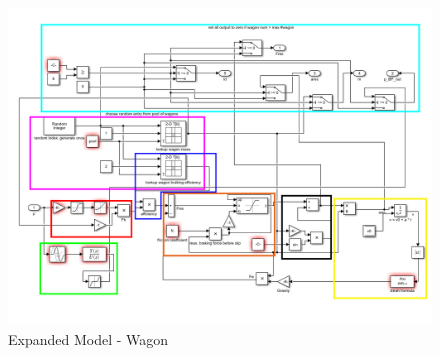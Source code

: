 \begin{figure}[H]
	\centering
	\includegraphics[width=\linewidth]{./pic/expandedmodel_wagon}
	\caption{Expanded Model - Wagon}
	\label{fig:expandedmodel_wagon}
\end{figure}


